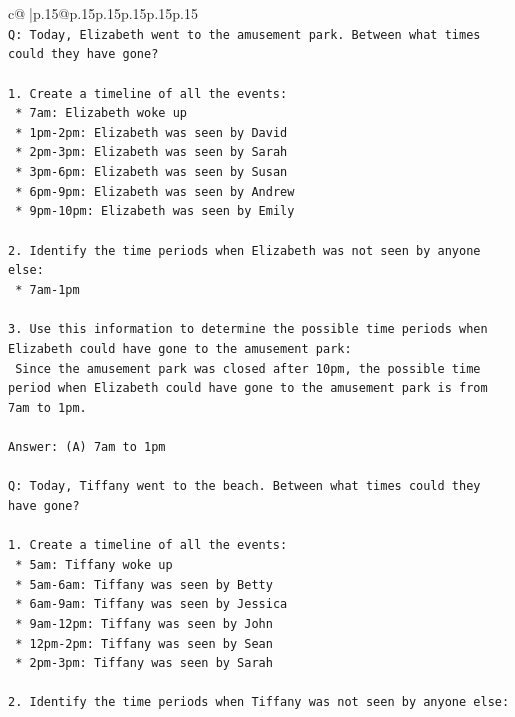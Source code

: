 \documentclass{article}
\begin{document}
{\begin{supertabular}{c@{$\;$}|p{.15\linewidth}@{}p{.15\linewidth}p{.15\linewidth}p{.15\linewidth}p{.15\linewidth}p{.15\linewidth}}
{{{\\ 
\texttt{Q: Today, Elizabeth went to the amusement park. Between what times could they have gone?} \\
\\ 
\texttt{1. Create a timeline of all the events:} \\
\texttt{   * 7am: Elizabeth woke up} \\
\texttt{   * 1pm{-}2pm: Elizabeth was seen by David} \\
\texttt{   * 2pm{-}3pm: Elizabeth was seen by Sarah} \\
\texttt{   * 3pm{-}6pm: Elizabeth was seen by Susan} \\
\texttt{   * 6pm{-}9pm: Elizabeth was seen by Andrew} \\
\texttt{   * 9pm{-}10pm: Elizabeth was seen by Emily} \\
\\ 
\texttt{2. Identify the time periods when Elizabeth was not seen by anyone else:} \\
\texttt{   * 7am{-}1pm} \\
\\ 
\texttt{3. Use this information to determine the possible time periods when Elizabeth could have gone to the amusement park:} \\
\texttt{   Since the amusement park was closed after 10pm, the possible time period when Elizabeth could have gone to the amusement park is from 7am to 1pm.} \\
\\ 
\texttt{Answer: (A) 7am to 1pm} \\
\\ 
\texttt{Q: Today, Tiffany went to the beach. Between what times could they have gone?} \\
\\ 
\texttt{1. Create a timeline of all the events:} \\
\texttt{   * 5am: Tiffany woke up} \\
\texttt{   * 5am{-}6am: Tiffany was seen by Betty} \\
\texttt{   * 6am{-}9am: Tiffany was seen by Jessica} \\
\texttt{   * 9am{-}12pm: Tiffany was seen by John} \\
\texttt{   * 12pm{-}2pm: Tiffany was seen by Sean} \\
\texttt{   * 2pm{-}3pm: Tiffany was seen by Sarah} \\
\\ 
\texttt{2. Identify the time periods when Tiffany was not seen by anyone else:} \\
}}}
\end{supertabular}}
\end{document}
